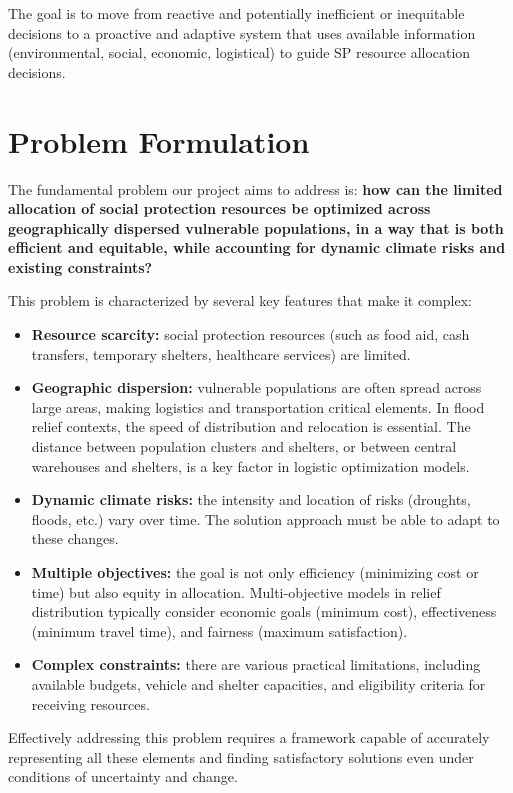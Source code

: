 The goal is to move from reactive and potentially inefficient or
inequitable decisions to a proactive and adaptive system that uses
available information (environmental, social, economic, logistical)
to guide SP resource allocation decisions.

\section{Problem Formulation}
The fundamental problem our project aims to address is:
\textbf{how can the limited allocation of social protection
    resources be optimized across geographically dispersed vulnerable
    populations, in a way that is both efficient and equitable, while
    accounting for dynamic climate risks and existing constraints?}

This problem is characterized by several key features that make it
complex:
\begin{itemize}
    \item \textbf{Resource scarcity:} social protection resources
          (such as food aid, cash transfers, temporary shelters, healthcare
          services) are limited.
    \item \textbf{Geographic dispersion:} vulnerable populations are
          often spread across large areas, making logistics and
          transportation critical elements. In flood relief contexts, the
          speed of distribution and relocation is essential. The distance
          between population clusters and shelters, or between central
          warehouses and shelters, is a key factor in logistic optimization
          models.
    \item \textbf{Dynamic climate risks:} the intensity and location
          of risks (droughts, floods, etc.) vary over time. The solution
          approach must be able to adapt to these changes.
    \item \textbf{Multiple objectives:} the goal is not only
          efficiency (minimizing cost or time) but also equity in
          allocation. Multi-objective models in relief distribution
          typically consider economic goals (minimum cost), effectiveness
          (minimum travel time), and fairness (maximum satisfaction).
    \item \textbf{Complex constraints:} there are various practical
          limitations, including available budgets, vehicle and shelter
          capacities, and eligibility criteria for receiving resources.
\end{itemize}

Effectively addressing this problem requires a framework capable of
accurately representing all these elements and finding satisfactory
solutions even under conditions of uncertainty and change.